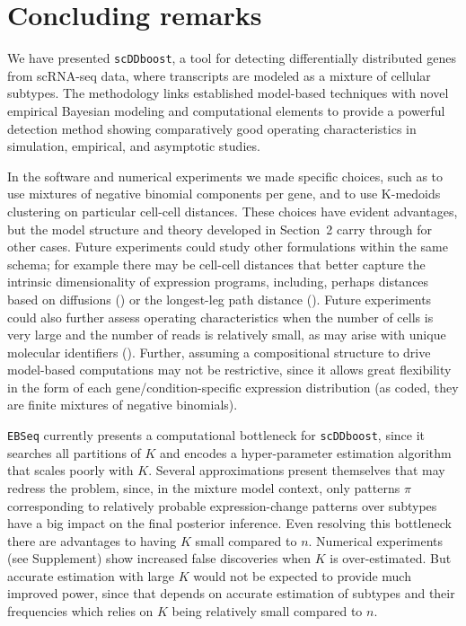 \documentclass[aoas,preprint]{imsart}
\begin{document}
\section{Concluding remarks}

We have presented \verb+scDDboost+,  a tool for
 detecting differentially distributed genes from scRNA-seq data,
where transcripts are modeled as a mixture of cellular subtypes. 
The methodology links established model-based
techniques with novel empirical Bayesian 
modeling and computational elements to  provide a powerful detection method showing 
comparatively good operating characteristics in simulation, empirical, and asymptotic studies.

In the software and numerical experiments we made specific choices,
 such as to use mixtures of negative binomial components per gene, and to use K-medoids
clustering on particular cell-cell distances.   These choices have evident advantages, but the 
model structure and theory developed in Section~2 carry through for other cases. Future experiments
could study other formulations within the same schema; for example there may be cell-cell 
distances that better capture the intrinsic dimensionality of expression programs, including, perhaps
distances based on diffusions (\cite{Haghverdi:2015aa}) or  
the longest-leg path distance (\cite{Little2017PathBasedSC}).
Future experiments could also further assess operating characteristics when the number of cells is very large 
and the number of reads is relatively small, as may arise with unique molecular identifiers (\cite{Chen:2018aa}).
Further, assuming a compositional structure to drive model-based computations may not be restrictive,
since it allows great flexibility in the form of each gene/condition-specific expression distribution
(as coded, they are finite mixtures of negative binomials).

   
\verb+EBSeq+ currently presents a computational bottleneck for \verb+scDDboost+, since it
searches all partitions of $K$ and encodes a hyper-parameter estimation algorithm that scales poorly with $K$.
Several approximations present themselves that may redress the problem, since,
in the mixture model context, only patterns $\pi$ corresponding to relatively probable expression-change
patterns over subtypes have a big impact on the final posterior inference.   Even resolving this
bottleneck there are advantages to having $K$ small compared to $n$.  Numerical experiments (see Supplement)
show increased false discoveries when $K$ is over-estimated.  But accurate estimation with large $K$ would
not be expected to provide much improved power, since that depends on accurate estimation of subtypes and their
frequencies which relies on $K$ being relatively small compared to $n$.
\end{document}
